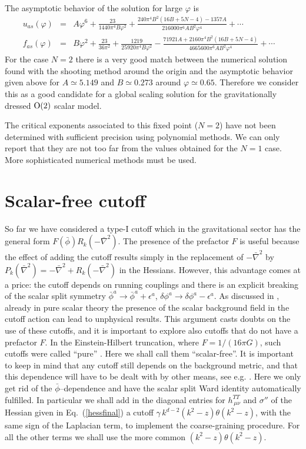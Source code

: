 \documentclass[11pt]{book} %
\newcommand{\bea}{\begin{eqnarray}}
\newcommand{\eea}{\end{eqnarray}}
\newcommand{\bnabla}{\bar\nabla}
\begin{document}
The asymptotic behavior of the solution
for large $\varphi$ is
\bea
u_{as}(\varphi)&=&
A \varphi ^6+\frac{23}{1440 \pi ^4 B \varphi ^2}+\frac{240 \pi ^4 B^2 (16 B+5 N-4)-1357 A}{216000 \pi ^6 A B^2 \varphi ^4}+\cdots\nonumber\\
f_{as}(\varphi)&=&
B \varphi ^2+\frac{23}{36 \pi ^2}+\frac{1219}{25920 \pi ^4 B \varphi ^2}
-\frac{71921 A+2160 \pi ^4 B^2 (16 B+5 N-4)}{4665600 \pi ^6 A B^2 \varphi ^4}+\cdots \quad
\eea
For the case $N=2$ %
there is a very good match between the numerical solution found with the shooting method around the origin
and the asymptotic behavior given above for $A\simeq 5.149$ and $B\simeq 0.273$ around $\varphi\simeq0.65$.
Therefore we consider this as a good candidate for
a global scaling solution for the gravitationally
dressed ${\rm O(2)}$ scalar model.


The critical exponents associated to this fixed point ($N=2$) have not been determined with sufficient precision using polynomial methods. We can only report that they are not too far from the values obtained for the $N=1$ case.
More sophisticated numerical methods must be used.





\section{Scalar-free cutoff}

So far we have considered a type-I cutoff which in the gravitational
sector has the general form $F(\bar\phi)R_k(-\bnabla^2)$.
The presence of the prefactor $F$ is useful because the effect
of adding the cutoff results simply in the replacement of
$-\bnabla^2$ by $P_k(\bnabla^2)=-\bnabla^2+R_k(-\bnabla^2)$
in the Hessians.
However, this advantage comes at a price:
the cutoff depends on running couplings
and there is an explicit breaking of the scalar split symmetry
$\bar\phi^a\to\bar\phi^a+\epsilon^a$,
$\delta\phi^a\to\delta\phi^a-\epsilon^a$.
As discussed in \cite{dietz3}, already in pure scalar theory
the presence of the scalar background field
in the cutoff action can lead to unphysical results.
This argument casts doubts on the use of these cutoffs,
and it is important to explore also cutoffs that
do not have a prefactor $F$.
In the Einstein-Hilbert truncation, where $F=1/(16\pi G)$,
such cutoffs were called ``pure'' \cite{narain3}.
Here we shall call them ``scalar-free''.
It is important to keep in mind that any cutoff still
depends on the background metric, and that this dependence will
have to be dealt with by other means, see e.g. \cite{dietz4,becker}.
Here we only get rid of the $\bar\phi$--dependence and have the scalar split Ward identity automatically fulfilled.
In particular we shall add in the diagonal entries for $h^{TT}_{\,\mu\nu}$ and $\sigma''$ of the Hessian given in Eq.~(\ref{hessfinal})  a cutoff $\gamma\, k^{d-2}(k^2-z)\theta(k^2-z)$,
with the same sign of the Laplacian term, to implement the coarse-graining procedure. For all the other terms we shall use the more common
$(k^2-z)\theta(k^2-z)$.
\end{document}
